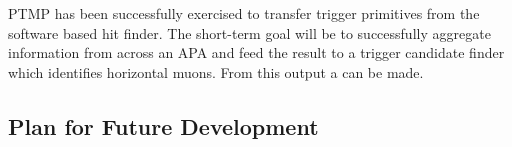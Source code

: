 PTMP has been successfully exercised to transfer trigger primitives from the software based hit finder. The short-term goal will be to successfully aggregate information from across an APA and feed the result to a trigger candidate finder which identifies horizontal muons. From this output a  can be made.




\subsection{Plan for Future Development}
\label{sec:sp-daq:design-plans}

